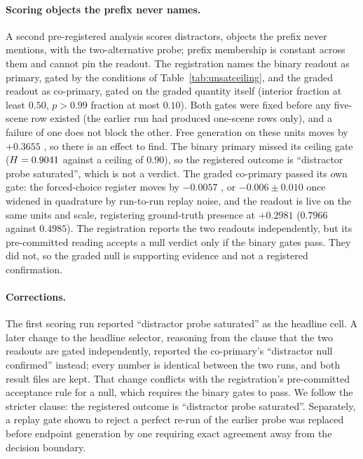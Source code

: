 \paragraph{Scoring objects the prefix never names.}\label{app:unsat-scope} A second pre-registered
analysis scores distractors, objects the prefix never mentions, with the two-alternative probe;
prefix membership is constant across them and cannot pin the readout. The registration names the
binary readout as primary, gated by the conditions of Table~\ref{tab:unsatceiling}, and the graded
readout as co-primary, gated on the graded quantity itself (interior fraction at least $0.50$,
$p > 0.99$ fraction at most $0.10$). Both gates were fixed before any five-scene row existed (the
earlier run had produced one-scene rows only), and a failure of one does not block the other. Free
generation on these units moves by $+0.3655$ , so there is an effect to find.
The binary primary missed its ceiling gate ($H = 0.9041$ against a ceiling of $0.90$), so the
registered outcome is ``distractor probe saturated'', which is not a verdict. The graded co-primary passed
its own gate: the forced-choice register moves by $-0.0057$ , or
$-0.006 \pm 0.010$ once widened in quadrature by run-to-run replay noise, and the readout is live on
the same units and scale, registering ground-truth presence at $+0.2981$ ($0.7966$ against $0.4985$).
The registration reports the two readouts independently, but its pre-committed reading accepts a null
verdict only if the binary gates pass. They did not, so the graded null is supporting evidence and not
a registered confirmation.

\paragraph{Corrections.} The first scoring run reported ``distractor probe saturated'' as the headline
cell. A later change to the headline selector, reasoning from the clause that the two readouts are
gated independently, reported the co-primary's ``distractor null confirmed'' instead; every
number is identical between the two runs, and both result files are kept. That change conflicts with
the registration's pre-committed acceptance rule for a null, which requires the binary gates to pass.
We follow the stricter clause: the registered outcome is ``distractor probe saturated''. Separately, a replay gate shown to reject a perfect re-run of the earlier probe was
replaced before endpoint generation by one requiring exact agreement away from the decision boundary.

